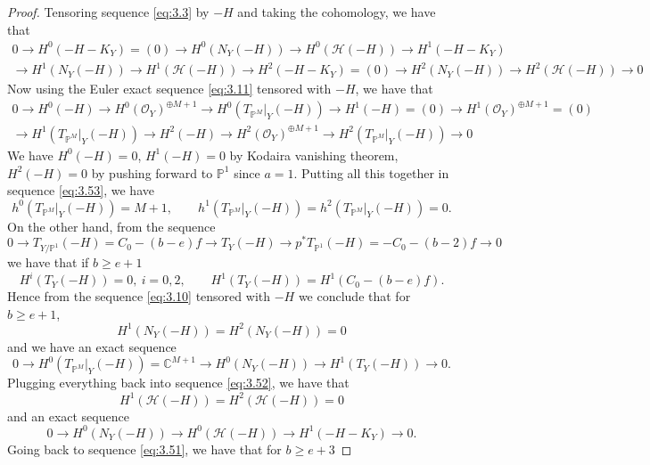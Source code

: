 \documentclass[11pt,twoside]{amsart}
\theoremstyle{plain}
\theoremstyle{definition}
\newcommand{\PP}{\mathbb{P}}
\newcommand{\PM}{\mathbb{P}^M}
\newcommand{\OO}{\mathcal{O}}
\newcommand{\NY}{N_{Y}}
\newcommand{\Hc}{\mathcal{H}}
\newcommand{\TP}{T_{\PM}|_Y}
\begin{document}
\begin{proof}
Tensoring sequence \eqref{eq:3.3} by $-H$ and taking the cohomology, we have that
\begin{multline}\label{eq:3.52}
0\to H^0(-H-K_Y)=(0)\to H^0(\NY(-H))\to H^0(\Hc(-H))\to H^1(-H-K_Y)\\
\to H^1(\NY(-H))\to H^1(\Hc(-H))\to H^2(-H-K_Y)=(0)\to H^2(\NY(-H))\to H^2(\Hc(-H))\to 0
\end{multline}
Now using the Euler exact sequence \eqref{eq:3.11} tensored with $-H$, we have that
\begin{multline}\label{eq:3.53}
0\to H^0(-H)\to H^0(\OO_Y)^{\oplus M+1}\to H^0(\TP(-H))\to H^1(-H)=(0)\to H^1(\OO_Y)^{\oplus M+1}=(0)\\
\to H^1(\TP(-H))\to H^2(-H)\to H^2(\OO_Y)^{\oplus M+1}\to H^2(\TP(-H))\to 0
\end{multline}
We have $H^0(-H)=0$, $H^1(-H)=0$ by Kodaira vanishing theorem, $H^2(-H)=0$ by pushing forward to $\PP^1$ since $a=1$. Putting all this together in sequence \eqref{eq:3.53}, we have
\begin{equation}\label{eq:3.54}
h^0(\TP(-H))=M+1,\qquad h^1(\TP(-H))=h^2(\TP(-H))=0 .
\end{equation}
On the other hand, from the sequence
\begin{equation}\label{eq:3.55}
0\to T_{Y/\PP^1}(-H)=C_0-(b-e)f\to T_Y(-H)\to p^*T_{\PP^1}(-H)=-C_0-(b-2)f\to 0
\end{equation}
we have that if $b\ge e+1$
\begin{equation}\label{eq:3.56}
H^i(T_Y(-H))=0,\ i=0,2,\qquad H^1(T_Y(-H))=H^1(C_0-(b-e)f).
\end{equation}
Hence from the sequence \eqref{eq:3.10} tensored with $-H$ we conclude that for $b\ge e+1$,
\begin{equation}\label{eq:3.57}
H^1(\NY(-H))=H^2(\NY(-H))=0
\end{equation}
and we have an exact sequence
\begin{equation}\label{eq:3.58}
0\to H^0(\TP(-H))=\mathbb{C}^{M+1}\to H^0(\NY(-H))\to H^1(T_Y(-H))\to 0 .
\end{equation}
Plugging everything back into sequence \eqref{eq:3.52}, we have that
\begin{equation}\label{eq:3.59}
H^1(\Hc(-H))=H^2(\Hc(-H))=0
\end{equation}
and an exact sequence
\begin{equation}\label{eq:3.60}
0\to H^0(\NY(-H))\to H^0(\Hc(-H))\to H^1(-H-K_Y)\to 0 .
\end{equation}
Going back to sequence \eqref{eq:3.51}, we have that for $b\ge e+3$

\end{proof}
\end{document}
